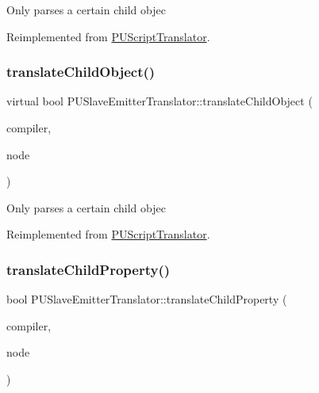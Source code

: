Only parses a certain child objec 

Reimplemented from \hyperlink{classPUScriptTranslator_ab587d01348ae3e678cb700c719b2b113}{P\+U\+Script\+Translator}.

\mbox{\label{classPUSlaveEmitterTranslator_a18c86075146e345fd8d84d6bf4c830a7}} 
\subsubsection{\texorpdfstring{translate\+Child\+Object()}{translateChildObject()}\hspace{0.1cm}{\footnotesize\ttfamily [2/2]}}
{\footnotesize\ttfamily virtual bool P\+U\+Slave\+Emitter\+Translator\+::translate\+Child\+Object (\begin{DoxyParamCaption}\item[{\hyperlink{classPUScriptCompiler}{P\+U\+Script\+Compiler} $\ast$}]{compiler,  }\item[{\hyperlink{classPUAbstractNode}{P\+U\+Abstract\+Node} $\ast$}]{node }\end{DoxyParamCaption})\hspace{0.3cm}{\ttfamily [virtual]}}

Only parses a certain child objec 

Reimplemented from \hyperlink{classPUScriptTranslator_ab587d01348ae3e678cb700c719b2b113}{P\+U\+Script\+Translator}.

\mbox{\label{classPUSlaveEmitterTranslator_ab4792b47518f7993d5da8af87a00d80d}} 
\subsubsection{\texorpdfstring{translate\+Child\+Property()}{translateChildProperty()}\hspace{0.1cm}{\footnotesize\ttfamily [1/2]}}
{\footnotesize\ttfamily bool P\+U\+Slave\+Emitter\+Translator\+::translate\+Child\+Property (\begin{DoxyParamCaption}\item[{\hyperlink{classPUScriptCompiler}{P\+U\+Script\+Compiler} $\ast$}]{compiler,  }\item[{\hyperlink{classPUAbstractNode}{P\+U\+Abstract\+Node} $\ast$}]{node }\end{DoxyParamCaption})\hspace{0.3cm}{\ttfamily [virtual]}}

